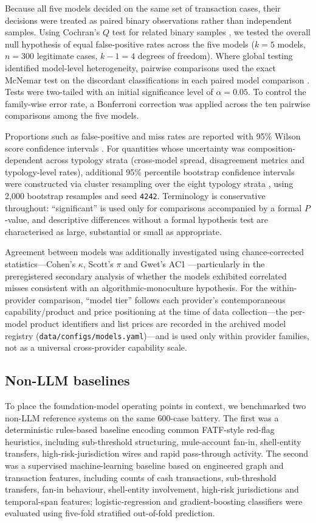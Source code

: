 \documentclass[pdflatex,sn-basic,Numbered]{sn-jnl}
\begin{document}
Because all five models decided on the same set of transaction cases, their decisions were treated as paired binary observations rather than independent samples. Using Cochran's $Q$ test for related binary samples \cite{cochran}, we tested the overall null hypothesis of equal false-positive rates across the five models ($k=5$ models, $n=300$ legitimate cases, $k-1=4$ degrees of freedom). Where global testing identified model-level heterogeneity, pairwise comparisons used the exact McNemar test on the discordant classifications in each paired model comparison \cite{mcnemar}. Tests were two-tailed with an initial significance level of $\alpha=0.05$. To control the family-wise error rate, a Bonferroni correction was applied across the ten pairwise comparisons among the five models.

Proportions such as false-positive and miss rates are reported with 95\% Wilson score confidence intervals \cite{wilson}. For quantities whose uncertainty was composition-dependent across typology strata (cross-model spread, disagreement metrics and typology-level rates), additional 95\% percentile bootstrap confidence intervals were constructed via cluster resampling over the eight typology strata \cite{bootstrap}, using 2{,}000 bootstrap resamples and seed \texttt{4242}. Terminology is conservative throughout: ``significant'' is used only for comparisons accompanied by a formal $P$-value, and descriptive differences without a formal hypothesis test are characterised as large, substantial or small as appropriate.

Agreement between models was additionally investigated using chance-corrected statistics---Cohen's $\kappa$, Scott's $\pi$ and Gwet's AC1 \cite{gwet}---particularly in the preregistered secondary analysis of whether the models exhibited correlated misses consistent with an algorithmic-monoculture hypothesis. For the within-provider comparison, ``model tier'' follows each provider's contemporaneous capability/product and price positioning at the time of data collection---the per-model product identifiers and list prices are recorded in the archived model registry (\texttt{data/configs/models.yaml})---and is used only within provider families, not as a universal cross-provider capability scale.

\subsection{Non-LLM baselines}

To place the foundation-model operating points in context, we benchmarked two non-LLM reference systems on the same 600-case battery. The first was a deterministic rules-based baseline encoding common FATF-style red-flag heuristics, including sub-threshold structuring, mule-account fan-in, shell-entity transfers, high-risk-jurisdiction wires and rapid pass-through activity. The second was a supervised machine-learning baseline based on engineered graph and transaction features, including counts of cash transactions, sub-threshold transfers, fan-in behaviour, shell-entity involvement, high-risk jurisdictions and temporal-span features; logistic-regression and gradient-boosting classifiers were evaluated using five-fold stratified out-of-fold prediction.
\end{document}
